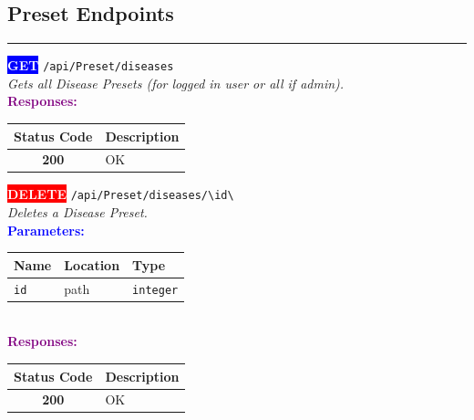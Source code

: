\subsection{Preset Endpoints}

\noindent\textcolor{gray!60}{\rule{\linewidth}{0.5pt}}
\vspace{0.5em}

\begin{tcolorbox}[
    colback=blue!5,
    colframe=blue,
    arc=2mm,
    boxrule=1pt,
    left=5pt,
    right=5pt,
    top=5pt,
    bottom=5pt
]
\noindent\colorbox{blue}{\textcolor{white}{\textbf{GET}}} 
\texttt{\large /api/Preset/diseases}\\[0.3em]
\textit{Gets all Disease Presets (for logged in user or all if admin).}\\[0.3em]
\vspace{0.3em}
\textbf{\textcolor{purple}{Responses:}}\\[0.2em]
\begin{tabular}{|c|p{10cm}|}
\hline
\rowcolor{gray!20}
\textbf{Status Code} & \textbf{Description} \\ \hline
\colorbox{green!20}{\textbf{200}} & OK \\ \hline
\end{tabular}
\end{tcolorbox}
\vspace{0.5em}

\begin{tcolorbox}[
    colback=red!5,
    colframe=red,
    arc=2mm,
    boxrule=1pt,
    left=5pt,
    right=5pt,
    top=5pt,
    bottom=5pt
]
\noindent\colorbox{red}{\textcolor{white}{\textbf{DELETE}}} 
\texttt{\large /api/Preset/diseases/\textbackslash{}{id\textbackslash{}}}\\[0.3em]
\textit{Deletes a Disease Preset.}\\[0.3em]
\vspace{0.3em}
\textbf{\textcolor{blue}{Parameters:}}\\[0.2em]
\begin{tabular}{|l|l|l|}
\hline
\rowcolor{gray!20}
\textbf{Name} & \textbf{Location} & \textbf{Type} \\ \hline
\texttt{id} & path & \texttt{integer} \\ \hline
\end{tabular}\\[0.5em]
\vspace{0.3em}
\textbf{\textcolor{purple}{Responses:}}\\[0.2em]
\begin{tabular}{|c|p{10cm}|}
\hline
\rowcolor{gray!20}
\textbf{Status Code} & \textbf{Description} \\ \hline
\colorbox{green!20}{\textbf{200}} & OK \\ \hline
\end{tabular}
\end{tcolorbox}
\vspace{0.5em}

